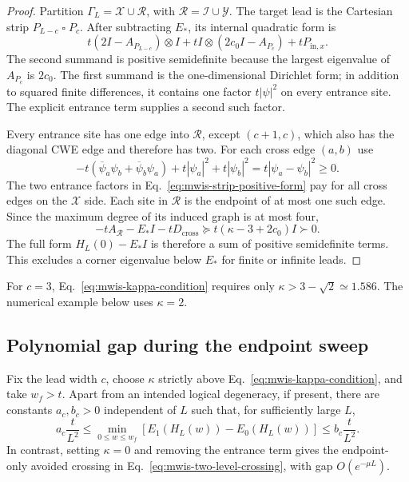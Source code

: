 \begin{proof}
Partition $\Gamma_L=\mathcal X\cup\mathcal R$, with
$\mathcal R=\mathcal I\cup\mathcal Y$.  The target lead is the Cartesian
strip $P_{L-c}\mathbin{\square}P_c$.  After subtracting $E_*$, its internal
quadratic form is
\begin{equation}
 t(2I-A_{P_{L-c}})\otimes I
 +tI\otimes(2c_0I-A_{P_c})
 +tP_{\mathrm{in},x}.
 \label{eq:mwis-strip-positive-form}
\end{equation}
The second summand is positive semidefinite because the largest eigenvalue of
$A_{P_c}$ is $2c_0$.  The first summand is the one-dimensional Dirichlet form;
in addition to squared finite differences, it contains one factor
$t|\psi|^2$ on every entrance site.  The explicit entrance term supplies a
second such factor.

Every entrance site has one edge into $\mathcal R$, except
$(c+1,c)$, which also has the diagonal CWE edge and therefore has two.  For
each cross edge $(a,b)$ use
\begin{equation}
 -t(\overline\psi_a\psi_b+\overline\psi_b\psi_a)
 +t|\psi_a|^2+t|\psi_b|^2
 =t|\psi_a-\psi_b|^2\geq0.
 \label{eq:mwis-edge-square}
\end{equation}
The two entrance factors in Eq.~\eqref{eq:mwis-strip-positive-form} pay for
all cross edges on the $\mathcal X$ side.  Each site in $\mathcal R$ is the
endpoint of at most one such edge.  Since the maximum degree of its induced
graph is at most four,
\begin{equation}
 -tA_{\mathcal R}-E_*I-tD_{\mathrm{cross}}
 \succeq t(\kappa-3+2c_0)I\succ0.
 \label{eq:mwis-R-positive}
\end{equation}
The full form $H_L(0)-E_*I$ is therefore a sum of positive semidefinite terms.
This excludes a corner eigenvalue below $E_*$ for finite or infinite leads.
\end{proof}

For $c=3$, Eq.~\eqref{eq:mwis-kappa-condition} requires only
$\kappa>3-\sqrt{2}\simeq1.586$.  The numerical example below uses
$\kappa=2$.

\subsection{Polynomial gap during the endpoint sweep}

\begin{theorem}
\label{thm:mwis-polynomial-gap}
Fix the lead width $c$, choose $\kappa$ strictly above
Eq.~\eqref{eq:mwis-kappa-condition}, and take $w_f>t$.  Apart from an intended
logical degeneracy, if present, there are constants $a_c,b_c>0$ independent of
$L$ such that, for sufficiently large $L$,
\begin{equation}
 a_c\frac{t}{L^2}
 \leq
 \min_{0\leq w\leq w_f}
 [E_1(H_L(w))-E_0(H_L(w))]
 \leq b_c\frac{t}{L^2}.
 \label{eq:mwis-poly-gap-bound}
\end{equation}
In contrast, setting $\kappa=0$ and removing the entrance term gives the
endpoint-only avoided crossing in Eq.~\eqref{eq:mwis-two-level-crossing}, with
gap $O(e^{-\mu L})$.
\end{theorem}


